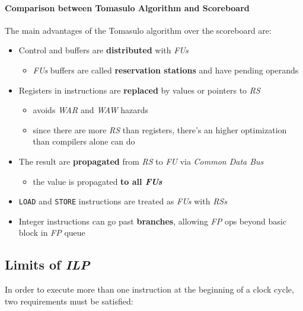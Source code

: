 \documentclass[english]{article}
\begin{document}
\paragraph{Comparison between Tomasulo Algorithm and Scoreboard}

The main advantages of the Tomasulo algorithm over the scoreboard are:

\begin{itemize}
  \item Control and buffers are \textbf{distributed} with \textit{FUs}
        \begin{itemize}
          \item \textit{FUs} buffers are called \textbf{reservation stations} and have pending operands
        \end{itemize}
  \item Registers in instructions are \textbf{replaced} by values or pointers to \textit{RS}
        \begin{itemize}
          \item avoids \textit{WAR} and \textit{WAW} hazards
          \item since there are more \textit{RS} than registers, there's an higher optimization than compilers alone can do
        \end{itemize}
  \item The result are \textbf{propagated} from \textit{RS} to \textit{FU} via \textit{Common Data Bus}
        \begin{itemize}
          \item the value is propagated \textbf{to all \textit{FUs}}
        \end{itemize}
  \item \texttt{LOAD} and \texttt{STORE} instructions are treated as \textit{FUs} with \textit{RSs}
  \item Integer instructions can go past \textbf{branches}, allowing \textit{FP} ops beyond basic block in \textit{FP} queue
\end{itemize}

\subsection{Limits of \textit{ILP}}

In order to execute more than one instruction at the beginning of a clock cycle, two requirements must be satisfied:
\end{document}
